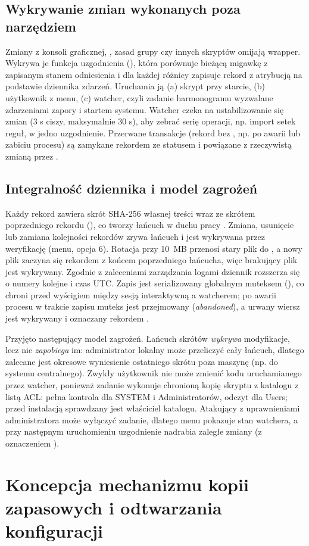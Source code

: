 \subsection{Wykrywanie zmian wykonanych poza narzędziem}\label{subsec:wykrywanie-zewnetrznych}

Zmiany z konsoli graficznej, , zasad grupy czy innych skryptów omijają wrapper. Wykrywa je funkcja uzgodnienia (), która porównuje bieżącą migawkę z zapisanym stanem odniesienia i dla każdej różnicy zapisuje rekord  z atrybucją na podstawie dziennika zdarzeń. Uruchamia ją (a) skrypt przy starcie, (b) użytkownik z menu, (c) watcher, czyli zadanie harmonogramu wyzwalane zdarzeniami zapory i startem systemu. Watcher czeka na ustabilizowanie się zmian (3 s ciszy, maksymalnie 30 s), aby zebrać serię operacji, np. import setek reguł, w jedno uzgodnienie. Przerwane transakcje (rekord  bez , np. po awarii lub zabiciu procesu) są zamykane rekordem  ze statusem  i powiązane z rzeczywistą zmianą przez .

\subsection{Integralność dziennika i model zagrożeń}\label{subsec:integralnosc-logu}\label{subsec:model-zagrozen}

Każdy rekord zawiera skrót SHA-256 własnej treści wraz ze skrótem poprzedniego rekordu (), co tworzy łańcuch w duchu pracy \cite{schneier-kelsey-1999}. Zmiana, usunięcie lub zamiana kolejności rekordów zrywa łańcuch i jest wykrywana przez weryfikację (menu, opcja 6). Rotacja przy 10~MB przenosi stary plik do , a nowy plik zaczyna się rekordem  z końcem poprzedniego łańcucha, więc brakujący plik jest wykrywany. Zgodnie z zaleceniami zarządzania logami \cite{nist-sp800-92} dziennik rozszerza się o numery kolejne i czas UTC. Zapis jest serializowany globalnym muteksem \cite{ms-mutex} (), co chroni przed wyścigiem między sesją interaktywną a watcherem; po awarii procesu w trakcie zapisu muteks jest przejmowany (\emph{abandoned}), a urwany wiersz jest wykrywany i oznaczany rekordem .

Przyjęto następujący model zagrożeń. Łańcuch skrótów \emph{wykrywa} modyfikacje, lecz nie \emph{zapobiega} im: administrator lokalny może przeliczyć cały łańcuch, dlatego zalecane jest okresowe wyniesienie ostatniego skrótu poza maszynę (np. do systemu centralnego). Zwykły użytkownik nie może zmienić kodu uruchamianego przez watcher, ponieważ zadanie wykonuje chronioną kopię skryptu z katalogu  z listą ACL: pełna kontrola dla SYSTEM i Administratorów, odczyt dla Users; przed instalacją sprawdzany jest właściciel katalogu. Atakujący z uprawnieniami administratora może wyłączyć zadanie, dlatego menu pokazuje stan watchera, a przy następnym uruchomieniu uzgodnienie nadrabia zaległe zmiany (z oznaczeniem ).

\section{Koncepcja mechanizmu kopii zapasowych i odtwarzania konfiguracji}\label{sec:koncepcja-backup}

